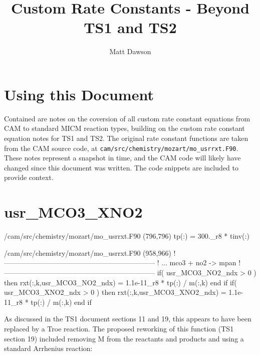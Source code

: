 \documentclass[titlepage]{article}
\begin{document}
\title{Custom Rate Constants - Beyond TS1 and TS2}
\author{Matt Dawson}
\maketitle


\section{Using this Document}

Contained are notes on the coversion of all custom rate constant equations
from CAM to standard MICM reaction types, building on
the custom rate constant equation notes for TS1 and TS2. The original
rate constant functions are taken from the CAM source code, at 
\verb>cam/src/chemistry/mozart/mo_usrrxt.F90>. These notes represent
a snapshot in time, and the CAM code will likely have changed since this
document was written. The code snippets are included to provide context. 



\section{usr\_MCO3\_XNO2}

\begin{blockcode}[commandchars=\\\{\}]
\color{gray}/cam/src/chemistry/mozart/mo_usrrxt.F90 (796,796)
       tp(:)             = 300._r8 * tinv(:)
\end{blockcode}       
\begin{blockcode}[commandchars=\\\{\}]
\color{gray}/cam/src/chemistry/mozart/mo_usrrxt.F90 (958,966)
!-----------------------------------------------------------------
!     ... mco3 + no2 -> mpan
!-----------------------------------------------------------------
       if( usr_MCO3_NO2_ndx > 0 ) then
          rxt(:,k,usr_MCO3_NO2_ndx) = 1.1e-11_r8 * tp(:) / m(:,k)
       end if
       if( usr_MCO3_XNO2_ndx > 0 ) then
          rxt(:,k,usr_MCO3_XNO2_ndx) = 1.1e-11_r8 * tp(:) / m(:,k)
       end if
\end{blockcode}

As discussed in the TS1 document sections 11 and 19, this appears to have been replaced
by a Troe reaction. The proposed reworking of this function (TS1 section 19) included
removing M from the reactants and products and using a standard Arrhenius reaction:
\end{document}
